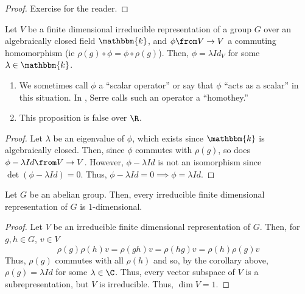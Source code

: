 \documentclass[11pt,leqno,oneside]{amsbook}
\newcommand{\bbk}{\mathbbm{k}}
\numberwithin{thm}{section}
\begin{document}
\begin{proof}
  Exercise for the reader.
\end{proof}
\begin{cor}\label{schur-alg-closed}
  Let \(V\) be a finite dimensional irreducible representation of a
  group \(G\) over an algebraically closed field \(\bbk\), and \(\phi
  \from V \to V\) a commuting homomorphism (ie \(\rho(g) \circ \phi = \phi
  \circ \rho(g)\)). Then, \(\phi = \lambda Id_V\) for some \(\lambda
  \in \bbk\).
\end{cor}
\begin{rmk}
  \begin{enumerate}
  \item We sometimes call \(\phi\) a ``scalar operator'' or say that
    \(\phi\) ``acts as a scalar'' in this situation. In \cite{serre},
    Serre calls such an operator a ``homothey.''
  \item This proposition is false over \(\R\).
  \end{enumerate}
\end{rmk}
\begin{proof}
  Let \(\lambda\) be an eigenvalue of \(\phi\), which exists since
  \(\bbk\) is algebraically closed. Then, since \(\phi\) commutes with
  \(\rho(g)\), so does \(\phi - \lambda Id \from V \to V\). However, \(\phi -
  \lambda Id\) is not an isomorphism since \(\det(\phi - \lambda Id) =
  0\). Thus, \(\phi - \lambda Id = 0 \implies \phi = \lambda Id\).
\end{proof}
\begin{cor}
  Let \(G\) be an abelian group. Then, every irreducible finite
  dimensional representation of \(G\) is \(1\)-dimensional.
\end{cor}
\begin{proof}
  Let \(V\) be an irreducible finite dimensional representation of
  \(G\). Then, for \(g,h \in G\), \(v \in V\) \[
    \rho(g) \rho(h) v = \rho(gh)v = \rho(hg)v = \rho(h)\rho(g) v
  \]
  Thus, \(\rho(g)\) commutes with all \(\rho(h)\) and so, by the
  corollary above, \(\rho(g) = \lambda Id\) for some \(\lambda \in
  \C\). Thus, every vector subspace of \(V\) is a subrepresentation,
  but \(V\) is irreducible. Thus, \(\dim V = 1\).
\end{proof}
\end{document}

